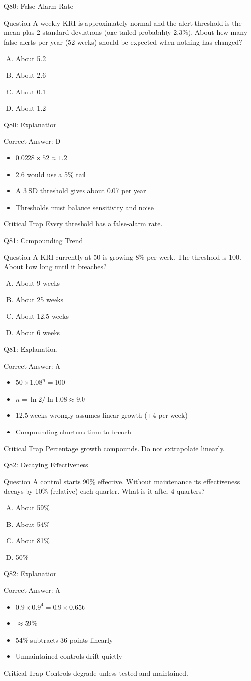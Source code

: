 \documentclass[aspectratio=169]{beamer}
\newcommand{\hq}[7]{%
  \begin{frame}{Q#1: #2}
    \begin{block}{Question}
      #3
    \end{block}
    \begin{enumerate}[(A)]
      #4
    \end{enumerate}
  \end{frame}
  \begin{frame}{Q#1: Explanation}
    \begin{block}{Correct Answer: #5}
      \begin{itemize}
        #6
      \end{itemize}
    \end{block}
    \begin{alertblock}{Critical Trap}
      #7
    \end{alertblock}
  \end{frame}
}
\begin{document}
\hq{80}{False Alarm Rate}
{A weekly KRI is approximately normal and the alert threshold is the mean plus 2 standard deviations (one-tailed probability 2.3\%). About how many false alerts per year (52 weeks) should be expected when nothing has changed?}
{\item About 5.2
 \item About 2.6
 \item About 0.1
 \item About 1.2}
{D}
{\item $0.0228 \times 52 \approx 1.2$
 \item 2.6 would use a 5\% tail
 \item A 3 SD threshold gives about 0.07 per year
 \item Thresholds must balance sensitivity and noise}
{Every threshold has a false-alarm rate.}

\hq{81}{Compounding Trend}
{A KRI currently at 50 is growing 8\% per week. The threshold is 100. About how long until it breaches?}
{\item About 9 weeks
 \item About 25 weeks
 \item About 12.5 weeks
 \item About 6 weeks}
{A}
{\item $50 \times 1.08^n = 100$
 \item $n = \ln 2 / \ln 1.08 \approx 9.0$
 \item 12.5 weeks wrongly assumes linear growth (+4 per week)
 \item Compounding shortens time to breach}
{Percentage growth compounds. Do not extrapolate linearly.}

\hq{82}{Decaying Effectiveness}
{A control starts 90\% effective. Without maintenance its effectiveness decays by 10\% (relative) each quarter. What is it after 4 quarters?}
{\item About 59\%
 \item About 54\%
 \item About 81\%
 \item 50\%}
{A}
{\item $0.9 \times 0.9^4 = 0.9 \times 0.656$
 \item $\approx 59\%$
 \item 54\% subtracts 36 points linearly
 \item Unmaintained controls drift quietly}
{Controls degrade unless tested and maintained.}
\end{document}
